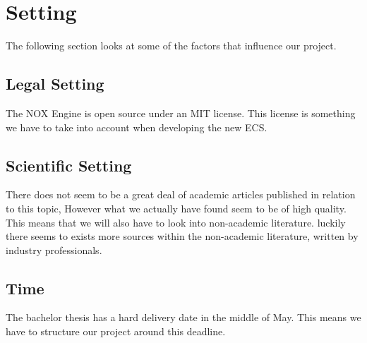 \section*{Setting}
The following section looks at some of the factors that influence our project.

\subsection*{Legal Setting}
The NOX Engine is open source under an MIT license. 
This license is something we have to take into account when developing the new ECS.

\subsection*{Scientific Setting}
There does not seem to be a great deal of academic articles published in relation to this topic,
However what we actually have found seem to be of high quality.
This means that we will also have to look into non-academic literature. 
luckily there seems to exists more sources within the non-academic literature, 
written by industry professionals.

\subsection*{Time}
The bachelor thesis has a hard delivery date in the middle of May. 
This means we have to structure our project around this deadline.